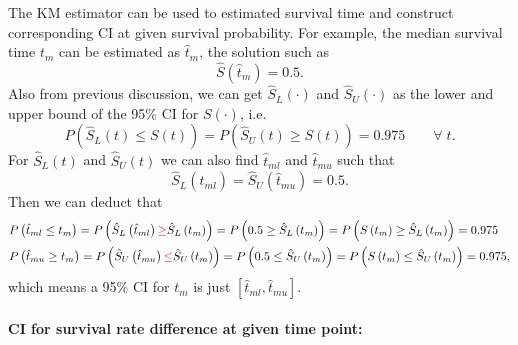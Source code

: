 \documentclass[a4paper,12pt]{article}
\begin{document}
The KM estimator can be used to estimated survival time and construct corresponding CI at given survival probability. For example, the median survival time $t_m$ can be estimated as $\hat{t}_m$, the solution such as
\[
  \hat{S}\left(\hat{t}_m\right) = 0.5
  .
\]
Also from previous discussion, we can get $\hat{S}_L\left(\cdot\right)$ and $\hat{S}_U\left(\cdot\right)$ as the lower and upper bound of the 95\% CI for $S\left(\cdot\right)$, i.e.
\[
  P\left(
    \hat{S}_L\left(t\right) \leq S\left(t\right)
  \right)
  = P\left(
    \hat{S}_U\left(t\right) \geq S\left(t\right)
  \right)
  = 0.975
  \quad\quad\forall\; t
  .
\]
For $\hat{S}_L\left(t\right)$ and $\hat{S}_U\left(t\right)$ we can also find $\hat{t}_{ml}$ and $\hat{t}_{mu}$ such that
\[
  \hat{S}_L\left(\hat{t}_{ml}\right) = \hat{S}_U\left(\hat{t}_{mu}\right) = 0.5.
\]
Then we can deduct that
\[
  \begin{aligned}
    & P\left(\hat{t}_{ml} \leq t_m\right)
    = P\left(
      \hat{S}_{L}\left(\hat{t}_{ml}\right)
      {\color{red} \geq} \hat{S}_L\left(t_m\right)
    \right)
    = P\left(0.5 \geq \hat{S}_L\left(t_m\right)\right)
    = P\left(S\left(t_m\right)
      \geq \hat{S}_L\left(t_m\right)\right)
    = 0.975    \\
    & P\left(\hat{t}_{mu} \geq t_m\right)
    = P\left(
      \hat{S}_U\left(\hat{t}_{mu}\right)
      {\color{red} \leq}
      \hat{S}_U\left(t_m\right)
    \right)
    = P\left(0.5 \leq \hat{S}_U\left(t_m\right)\right)
    = P\left(
      S\left(t_m\right)
      \leq \hat{S}_U\left(t_m\right)
    \right)
    = 0.975
    ,
  \end{aligned}
\]
which means a 95\% CI for $t_m$ is just $[\hat{t}_{ml}, \hat{t}_{mu}]$.

\paragraph{CI for survival rate difference at given time point: }
\end{document}
